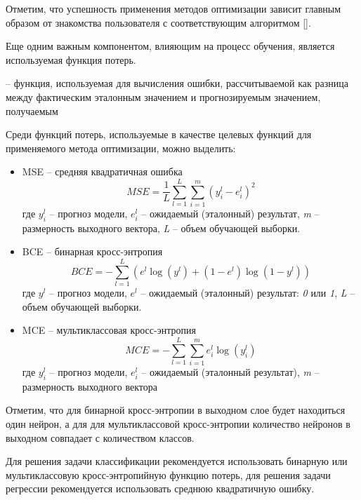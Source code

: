 Отметим, что успешность применения методов оптимизации зависит главным образом от знакомства пользователя с соответствующим алгоритмом [].

Еще одним важным компонентом, влияющим на процесс обучения, является используемая функция потерь.

 -- функция, используемая для вычисления ошибки, рассчитываемой как разница между фактическим эталонным значением и прогнозируемым значением, получаемым 

Среди функций потерь, используемые в качестве целевых функций для применяемого метода оптимизации, можно выделить:

\begin{itemize}
	\item MSE -- средняя квадратичная ошибка\\
		\begin{equation*}
			MSE = \frac{1}{L} \sum_{l=1}^L \sum_{i=1}^m (y_i^l - e_i^l)^2
		\end{equation*}
		где $y_i^l$ -- прогноз модели, $e_i^l$ -- ожидаемый (эталонный) результат, \textit{m} -- размерность выходного вектора, \textit{L} -- объем обучающей выборки.

	\item BCE -- бинарная кросс-энтропия\\
	\begin{equation*}
		BCE = - \sum_{l=1}^L (e^l \log(y^l) + (1 - e^l)\log(1 - y^l))
	\end{equation*}
	где $y^l$ -- прогноз модели, $e^l$ -- ожидаемый (эталонный) результат: \textit{0} или \textit{1}, \textit{L} -- объем обучающей выборки.
	\item MCE -- мультиклассовая кросс-энтропия\\
	\begin{equation*}
		MCE = - \sum_{l=1}^L \sum_{i=1}^m e_{i}^l \log(y_{i}^l)
	\end{equation*}
	где $y_{i}^l$ -- прогноз модели, $e_i^l$ -- ожидаемый (эталонный результат), \textit{m} -- размерность выходного вектора
\end{itemize}

Отметим, что для бинарной кросс-энтропии в выходном слое  будет находиться один нейрон, а для для мультиклассовой кросс-энтропии количество нейронов в выходном  совпадает с количеством классов.

Для решения задачи классификации рекомендуется использовать бинарную или мультиклассовую кросс-энтропийную функцию потерь, для решения задачи регрессии рекомендуется использовать среднюю квадратичную ошибку.


